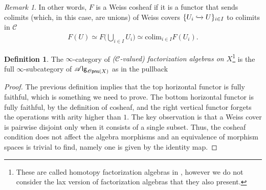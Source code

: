 \documentclass[12pt,a4paper]{article}
\newcounter{counter} \numberwithin{counter}{section}
\theoremstyle{definition}
\newtheorem{definition}[counter]{Definition}
\theoremstyle{plain}
\theoremstyle{remark}
\newtheorem{remark}[counter]{Remark}
\newcommand{\catC}{\mathscr{C}}
\newcommand{\falg}{\mathscr{F} \mathsf{Alg}}
\newcommand{\opens}[1][s]{%
    \ifx r#1\mathsf{Opns}\else
    \ifx s#1\mathscr{O} \mathsf{pns}\else
    \mathrm{Illegal~option}%
    \fi\fi
}
\newcommand{\csheaves}{\mathsf{c} \mathscr{S} \mathsf{hv}^{\mathsf{W}}}
\newcommand{\alg}[1]{\mathscr{A} \mathsf{lg}_{#1}}
\begin{document}
\begin{remark}
    In other words, $F$ is a Weiss cosheaf if it is a functor that sends colimits (which, in this case, are unions) of Weiss covers $\{ U_i \xhookrightarrow{} U \}_{i \in I}$ to colimits in $\catC$
    \begin{align}
        F(U) \simeq F \bigg( \bigcup_{i \in I} U_i \bigg) \simeq \mathrm{colim}_{i \in I} F(U_i).
    \end{align}
\end{remark}

\begin{definition}
    The $\infty$-category of \emph{($\catC$-valued) factorization algebras on $X$}\footnote{These are called homotopy factorization algebras in \cite{cg2016}, however we do not consider the lax version of factorization algebras that they also present.} is the full $\infty$-subcategory of $\alg{\opens[s](X)}$ as in the pullback
    \begin{center}
    \end{center}
\end{definition}

\begin{proof}
    The previous definition implies that the top horizontal functor is fully faithful, which is something we need to prove. The bottom horizontal functor is fully faithful, by the definition of cosheaf, and the right vertical functor forgets the operations with arity higher than $1$. The key observation is that a Weiss cover is pairwise disjoint only when it consists of a single subset. Thus, the cosheaf condition does not affect the algebra morphisms and an equivalence of morphism spaces is trivial to find, namely one is given by the identity map.
\end{proof}
\end{document}
